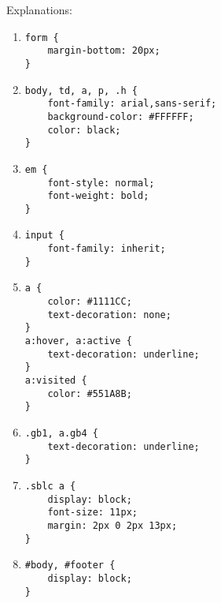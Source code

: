 \prt 
Explanations:
\begin{enumerate}
  \item \begin{verbatim}
form {
    margin-bottom: 20px;
}
\end{verbatim}
  \item \begin{verbatim}
body, td, a, p, .h {
    font-family: arial,sans-serif;
    background-color: #FFFFFF;
    color: black;
}
\end{verbatim}
  \item \begin{verbatim}
em {
    font-style: normal;
    font-weight: bold;
}
\end{verbatim}
 \item \begin{verbatim}
input {
    font-family: inherit;
}
\end{verbatim}
  \item \begin{verbatim}
a {
    color: #1111CC;
    text-decoration: none;
}
a:hover, a:active {
    text-decoration: underline;
}
a:visited {
    color: #551A8B;
}
\end{verbatim}
  \item \begin{verbatim}
.gb1, a.gb4 {
    text-decoration: underline;
}
\end{verbatim}
  \item \begin{verbatim}
.sblc a {
    display: block;
    font-size: 11px;
    margin: 2px 0 2px 13px;
}
\end{verbatim}
  \item \begin{verbatim}
#body, #footer {
    display: block;
}
\end{verbatim}
\end{enumerate}